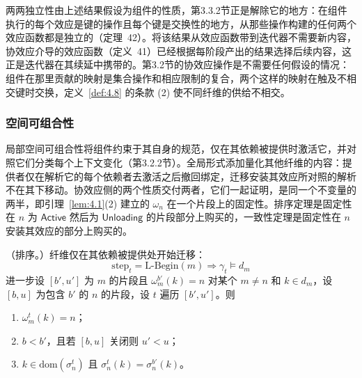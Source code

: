 两两独立性由上述结果假设为组件的性质，第3.3.2节正是解除它的地方：在组件执行的每个效应是键的操作且每个键是交换性的地方，从那些操作构建的任何两个效应函数都是独立的（定理~42）。将该结果从效应函数带到迭代器不需要新内容，协效应介导的效应函数（定义~41）已经根据每阶段产出的结果选择后续内容，这正是迭代器在其续延中携带的。第3.2节的协效应操作是不需要任何假设的情况：组件在那里贡献的映射是集合操作和相应限制的复合，两个这样的映射在触及不相交键时交换，定义~\ref{def:4.8} 的条款 (2) 使不同纤维的供给不相交。

\subsubsection{空间可组合性}\label{sec:4.4.3}

局部空间可组合性将组件约束于其自身的规范，仅在其依赖被提供时激活它，并对照它们分类每个上下文变化（第3.2.2节）。全局形式添加量化其他纤维的内容：提供者仅在解析它的每个依赖者去激活之后撤回绑定，迁移安装其效应所对照的解析不在其下移动。协效应侧的两个性质交付两者，它们一起证明，是同一个不变量的两半，即引理~\ref{lem:4.1}(2) 建立的 $\omega_n$ 在一个片段上的固定性。排序定理是固定性在 $n$ 为 $\mathsf{Active}$ 然后为 $\mathsf{Unloading}$ 的片段部分上购买的，一致性定理是固定性在 $n$ 安装其效应的部分上购买的。

\begin{theorem}\label{thm:4.3}
（排序。）纤维仅在其依赖被提供处开始迁移：
\begin{equation}\label{eq:4.27}
\mathrm{step}_t = \text{L-Begin}(m) \Rightarrow \gamma_t \models d_m
\end{equation}
进一步设 $[b', u']$ 为 $m$ 的片段且 $\omega^{b'}_m(k) = n$ 对某个 $m \neq n$ 和 $k \in d_m$，设 $[b, u]$ 为包含 $b'$ 的 $n$ 的片段，设 $t$ 遍历 $[b', u']$。则
\begin{enumerate}
\item $\omega^t_m(k) = n$；
\item $b < b'$，且若 $[b, u]$ 关闭则 $u' < u$；
\item $k \in \mathrm{dom}(\sigma^t_n)$ 且 $\sigma^t_n(k) = \sigma^{b'}_n(k)$。
\end{enumerate}
\end{theorem}

